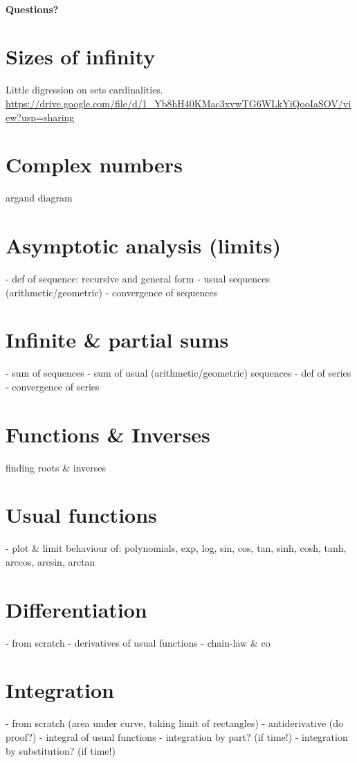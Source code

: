 \documentclass[11pt,a4paper]{article}
\begin{document}
\paragraph{Questions?}
\newpage


\section{Sizes of infinity}
Little digression on sets cardinalities.
\url{https://drive.google.com/file/d/1_Yb8hH40KMac3xvwTG6WLkYiQooIaSOV/view?usp=sharing}
\section{Complex numbers}
argand diagram

\section{Asymptotic analysis (limits)}
- def of sequence: recursive and general form
- usual sequences (arithmetic/geometric)
- convergence of sequences
\section{Infinite \& partial sums}
- sum of sequences
- sum of usual (arithmetic/geometric) sequences
- def of series
- convergence of series

\section{Functions \& Inverses}
finding roots \& inverses
\section{Usual functions}
- plot \& limit behaviour of: polynomials, exp, log, sin, cos, tan, sinh, cosh, tanh, arccos, arcsin, arctan
\section{Differentiation}
- from scratch
- derivatives of usual functions
- chain-law \& co

\section{Integration}
- from scratch (area under curve, taking limit of rectangles)
- antiderivative (do proof?)
- integral of usual functions
- integration by part? (if time!)
- integration by substitution? (if time!)
\end{document}

